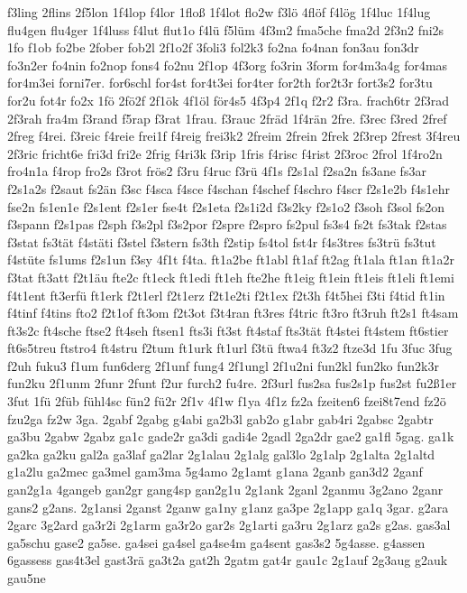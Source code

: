 {f3ling
2flins
2f5lon
1f4lop
f4lor
1floß
1f4lot
flo2w
f3lö
4flöf
f4lög
1f4luc
1f4lug
flu4gen
flu4ger
1f4luss
f4lut
flut1o
f4lü
f5lüm
4f3m2
fma5che
fma2d
2f3n2
fni2s
1fo
f1ob
fo2be
2fober
fob2l
2f1o2f
3foli3
fol2k3
fo2na
fo4nan
fon3au
fon3dr
fo3n2er
fo4nin
fo2nop
fons4
fo2nu
2f1op
4f3org
fo3rin
3form
for4m3a4g
for4mas
for4m3ei
forni7er.
for6schl
for4st
for4t3ei
for4ter
for2th
for2t3r
fort3s2
for3tu
for2u
fot4r
fo2x
1fö
2fö2f
2f1ök
4f1öl
för4s5
4f3p4
2f1q
f2r2
f3ra.
frach6tr
2f3rad
2f3rah
fra4m
f3rand
f5rap
f3rat
1frau.
f3rauc
2fräd
1f4rän
2fre.
f3rec
f3red
2fref
2freg
f4rei.
f3reic
f4reie
frei1f
f4reig
frei3k2
2freim
2frein
2frek
2f3rep
2frest
3f4reu
2f3ric
fricht6e
fri3d
fri2e
2frig
f4ri3k
f3rip
1fris
f4risc
f4rist
2f3roc
2frol
1f4ro2n
fro4n1a
f4rop
fro2s
f3rot
frös2
f3ru
f4ruc
f3rü
4f1s
f2s1al
f2sa2n
fs3ane
fs3ar
f2s1a2s
f2saut
fs2än
f3sc
f4sca
f4sce
f4schan
f4schef
f4schro
f4scr
f2s1e2b
f4s1ehr
fse2n
fs1en1e
f2s1ent
f2s1er
fse4t
f2s1eta
f2s1i2d
f3s2ky
f2s1o2
f3soh
f3sol
fs2on
f3spann
f2s1pas
f2sph
f3s2pl
f3s2por
f2spre
f2spro
fs2pul
fs3s4
fs2t
fs3tak
f2stas
f3stat
fs3tät
f4stäti
f3stel
f3stern
fs3th
f2stip
fs4tol
fst4r
f4s3tres
fs3trü
fs3tut
f4stüte
fs1ums
f2s1un
f3sy
4f1t
f4ta.
ft1a2be
ft1abl
ft1af
ft2ag
ft1ala
ft1an
ft1a2r
f3tat
ft3att
f2t1äu
fte2c
ft1eck
ft1edi
ft1eh
fte2he
ft1eig
ft1ein
ft1eis
ft1eli
ft1emi
f4t1ent
ft3erfü
ft1erk
f2t1erl
f2t1erz
f2t1e2ti
f2t1ex
f2t3h
f4t5hei
f3ti
f4tid
ft1in
f4tinf
f4tins
fto2
f2t1of
ft3om
f2t3ot
f3t4ran
ft3res
f4tric
ft3ro
ft3ruh
ft2s1
ft4sam
ft3s2c
ft4sche
ftse2
ft4seh
ftsen1
fts3i
ft3st
ft4staf
fts3tät
ft4stei
ft4stem
ft6stier
ft6s5treu
ftstro4
ft4stru
f2tum
ft1urk
ft1url
f3tü
ftwa4
ft3z2
ftze3d
1fu
3fuc
3fug
f2uh
fuku3
f1um
fun6derg
2f1unf
fung4
2f1ungl
2f1u2ni
fun2kl
fun2ko
fun2k3r
fun2ku
2f1unm
2funr
2funt
f2ur
furch2
fu4re.
2f3url
fus2sa
fus2s1p
fus2st
fu2ß1er
3fut
1fü
2füb
fühl4sc
fün2
fü2r
2f1v
4f1w
f1ya
4f1z
fz2a
fzeiten6
fzei8t7end
fz2ö
fzu2ga
fz2w
3ga.
2gabf
2gabg
g4abi
ga2b3l
gab2o
g1abr
gab4ri
2gabsc
2gabtr
ga3bu
2gabw
2gabz
ga1c
gade2r
ga3di
gadi4e
2gadl
2ga2dr
gae2
ga1fl
5gag.
ga1k
ga2ka
ga2ku
gal2a
ga3laf
ga2lar
2g1alau
2g1alg
gal3lo
2g1alp
2g1alta
2g1altd
g1a2lu
ga2mec
ga3mel
gam3ma
5g4amo
2g1amt
g1ana
2ganb
gan3d2
2ganf
gan2g1a
4gangeb
gan2gr
gang4sp
gan2g1u
2g1ank
2ganl
2ganmu
3g2ano
2ganr
gans2
g2ans.
2g1ansi
2ganst
2ganw
ga1ny
g1anz
ga3pe
2g1app
ga1q
3gar.
g2ara
2garc
3g2ard
ga3r2i
2g1arm
ga3r2o
gar2s
2g1arti
ga3ru
2g1arz
ga2s
g2as.
gas3al
ga5schu
gase2
ga5se.
ga4sei
ga4sel
ga4se4m
ga4sent
gas3s2
5g4asse.
g4assen
6gassess
gas4t3el
gast3rä
ga3t2a
gat2h
2gatm
gat4r
gau1c
2g1auf
2g3aug
g2auk
gau5ne
}
